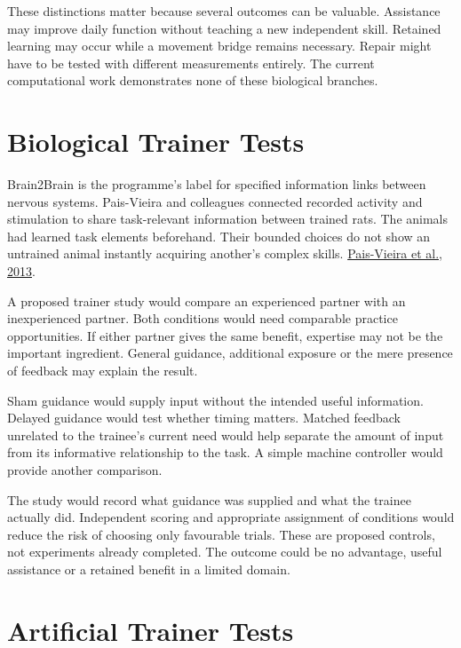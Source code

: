 These distinctions matter because several outcomes can be valuable. Assistance may improve daily function without teaching a new independent skill. Retained learning may occur while a movement bridge remains necessary. Repair might have to be tested with different measurements entirely. The current computational work demonstrates none of these biological branches.\par

\section{Biological Trainer Tests}

Brain2Brain is the programme's label for specified information links between nervous systems. Pais-Vieira and colleagues connected recorded activity and stimulation to share task-relevant information between trained rats. The animals had learned task elements beforehand. Their bounded choices do not show an untrained animal instantly acquiring another's complex skills. \href{https://www.nature.com/articles/srep01319}{Pais-Vieira et al., 2013}.\par

A proposed trainer study would compare an experienced partner with an inexperienced partner. Both conditions would need comparable practice opportunities. If either partner gives the same benefit, expertise may not be the important ingredient. General guidance, additional exposure or the mere presence of feedback may explain the result.\par

Sham guidance would supply input without the intended useful information. Delayed guidance would test whether timing matters. Matched feedback unrelated to the trainee's current need would help separate the amount of input from its informative relationship to the task. A simple machine controller would provide another comparison.\par

The study would record what guidance was supplied and what the trainee actually did. Independent scoring and appropriate assignment of conditions would reduce the risk of choosing only favourable trials. These are proposed controls, not experiments already completed. The outcome could be no advantage, useful assistance or a retained benefit in a limited domain.\par

\section{Artificial Trainer Tests}

